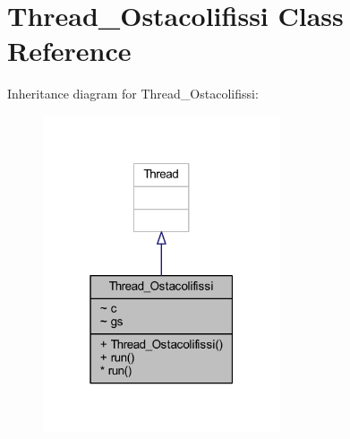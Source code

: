 \hypertarget{classcargame_1_1_thread___ostacolifissi}{}\section{Thread\+\_\+\+Ostacolifissi Class Reference}
\label{classcargame_1_1_thread___ostacolifissi}


Inheritance diagram for Thread\+\_\+\+Ostacolifissi\+:
\nopagebreak
\begin{figure}[H]
\begin{center}
\leavevmode
\includegraphics[width=199pt]{classcargame_1_1_thread___ostacolifissi__inherit__graph}
\end{center}
\end{figure}


